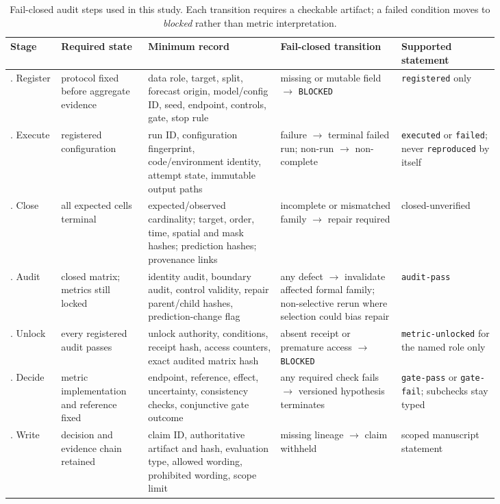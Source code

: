 \begin{table}[htbp]
\centering
\caption{Fail-closed audit steps used in this study.  Each transition requires a checkable artifact; a failed condition moves to \emph{blocked} rather than metric interpretation.}
\label{tab:audit-framework}
\scriptsize
\begin{tabular}{>{\raggedright\arraybackslash}p{0.08\linewidth}>{\raggedright\arraybackslash}p{0.14\linewidth}>{\raggedright\arraybackslash}p{0.23\linewidth}>{\raggedright\arraybackslash}p{0.21\linewidth}>{\raggedright\arraybackslash}p{0.17\linewidth}}
\toprule
Stage & Required state & Minimum record & Fail-closed transition & Supported statement \\
\midrule
1. Register & protocol fixed before aggregate evidence & data role, target, split, forecast origin, model/config ID, seed, endpoint, controls, gate, stop rule & missing or mutable field $\rightarrow$ \texttt{BLOCKED} & \texttt{registered} only \\
2. Execute & registered configuration & run ID, configuration fingerprint, code/environment identity, attempt state, immutable output paths & failure $\rightarrow$ terminal failed run; non-run $\rightarrow$ non-complete & \texttt{executed} or \texttt{failed}; never \texttt{reproduced} by itself \\
3. Close & all expected cells terminal & expected/observed cardinality; target, order, time, spatial and mask hashes; prediction hashes; provenance links & incomplete or mismatched family $\rightarrow$ repair required & closed-unverified \\
4. Audit & closed matrix; metrics still locked & identity audit, boundary audit, control validity, repair parent/child hashes, prediction-change flag & any defect $\rightarrow$ invalidate affected formal family; non-selective rerun where selection could bias repair & \texttt{audit-pass} \\
5. Unlock & every registered audit passes & unlock authority, conditions, receipt hash, access counters, exact audited matrix hash & absent receipt or premature access $\rightarrow$ \texttt{BLOCKED} & \texttt{metric-unlocked} for the named role only \\
6. Decide & metric implementation and reference fixed & endpoint, reference, effect, uncertainty, consistency checks, conjunctive gate outcome & any required check fails $\rightarrow$ versioned hypothesis terminates & \texttt{gate-pass} or \texttt{gate-fail}; subchecks stay typed \\
7. Write & decision and evidence chain retained & claim ID, authoritative artifact and hash, evaluation type, allowed wording, prohibited wording, scope limit & missing lineage $\rightarrow$ claim withheld & scoped manuscript statement \\
\bottomrule
\end{tabular}
\end{table}

